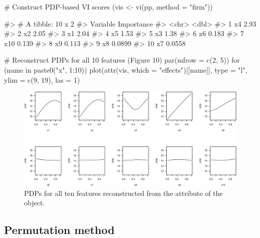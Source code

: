 \begin{Schunk}
\begin{Sinput}
# Construct PDP-based VI scores
(vis <- vi(pp, method = "firm"))
\end{Sinput}
\begin{Soutput}
#> # A tibble: 10 x 2
#>    Variable Importance
#>    <chr>         <dbl>
#>  1 x4           2.93  
#>  2 x2           2.05  
#>  3 x1           2.04  
#>  4 x5           1.53  
#>  5 x3           1.38  
#>  6 x6           0.183 
#>  7 x10          0.139 
#>  8 x9           0.113 
#>  9 x8           0.0899
#> 10 x7           0.0558
\end{Soutput}
\begin{Sinput}
# Reconstruct PDPs for all 10 features (Figure 10)
par(mfrow = c(2, 5))
for (name in paste0("x", 1:10)) {
  plot(attr(vis, which = "effects")[[name]], type = "l", ylim = c(9, 19), las = 1)
}
\end{Sinput}
\begin{figure}[!htb]

{\centering \includegraphics[width=1\linewidth]{greenwell-boehmke_files/figure-latex/pdp-from-attr-1} 

}

\caption[PDPs for all ten features reconstructed from the  attribute of the  object]{PDPs for all ten features reconstructed from the  attribute of the  object.}\label{fig:pdp-from-attr}
\end{figure}
\end{Schunk}

\subsection{Permutation method}

